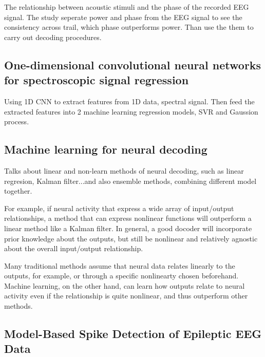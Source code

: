 \documentclass[8pt,a4paper]{article}
\begin{document}
The relationship between acoustic stimuli and the phase of the recorded EEG signal. 
The study seperate power and phase from the EEG signal to see the consistency across trail, which phase outperforms power. 
Than use the them to carry out decoding procedures.\cite{Benedict2012}

\subsection*{One-dimensional convolutional neural networks for spectroscopic signal regression} 
\label{sec:One-dimensional convolutional neural networks for spectroscopic signal regression}

Using 1D CNN to extract features from 1D data, spectral signal. 
Then feed the extracted features into 2 machine learning regression models, 
SVR and Gaussion process.\cite{malek2018}


\subsection*{Machine learning for neural decoding}
\label{sec:Machine learning for neural decoding}

Talks about linear and non-learn methods of neural decoding, such as linear regresion, 
Kalman filter...and also ensemble methods, combining different model together.

For example, if neural activity that express a wide array of input/output relationships, 
a method that can express nonlinear functions will outperform a linear method like a Kalman filter. 
In general, a good docoder will incorporate prior knowledge about the outputs, 
but still be nonlinear and relatively agnostic about the overall input/output relationship. 

Many traditional methods assume that neural data relates linearly to the outputs, 
for example, or through a specific nonlinearty chosen beforehand. 
Machine learning, on the other hand, can learn how outputs relate to neural activity 
even if the relationship is quite nonlinear, and thus outperform other methods.\cite{Glaser2017}

\subsection*{Model-Based Spike Detection of Epileptic EEG Data} 
\label{sec:Model-Based Spike Detection of Epileptic EEG Data}
\end{document}
